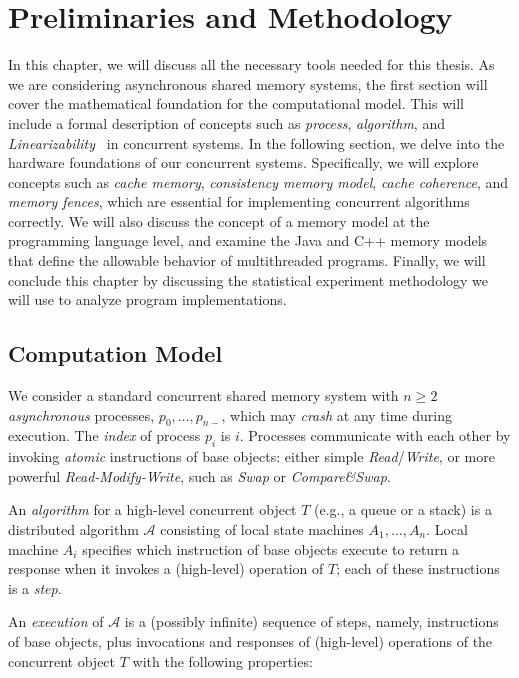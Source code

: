 \chapter{\label{chapter:preliminaries}Preliminaries and Methodology}

In this chapter, we will discuss all the necessary tools needed for this thesis. As we are considering asynchronous shared memory systems, the first section will cover the mathematical foundation for the computational model. This will include a formal description of concepts such as \emph{process},  \emph{algorithm}, and \emph{Linearizability~\cite{DBLP_journals_toplas_HerlihyW90}} in concurrent systems. In the following section, we delve into the hardware foundations of our concurrent systems. Specifically, we will explore concepts such as \emph{cache memory}, \emph{consistency memory model}, \emph{cache coherence}, and \emph{memory fences}, which are essential for implementing concurrent algorithms correctly. We will also discuss the concept of a memory model at the programming language level, and examine the Java and C++ memory models that define the allowable behavior of multithreaded programs. Finally, we will conclude this chapter by discussing the statistical experiment methodology we will use to analyze program implementations.

\section{\label{sec:computation-model}Computation Model}

We consider a standard concurrent shared memory system with \(n \ge 2\) \textit{asynchronous} processes, \(p_0, \ldots, p_{n-}\), which may \textit{crash} at any time during execution. The \textit{index} of process \(p_i\) is \(i\). Processes communicate with each other by invoking \textit{atomic} instructions of base objects: either simple \emph{Read}/\emph{Write}, or more powerful \emph{Read-Modify-Write}, such as \emph{Swap} or \emph{Compare\&Swap}.

An \emph{algorithm} for a high-level concurrent object \(T\) (e.g., a queue or a stack) is a distributed algorithm \(\mathcal{A}\) consisting of local state machines \(A_1,\ldots, A_n\). Local machine \(A_i\) specifies which instruction of base objects execute to return a response when it invokes a (high-level) operation of \(T\); each of these instructions is a \emph{step}.

An \emph{execution} of \(\mathcal{A}\) is a (possibly infinite) sequence of steps, namely, instructions of base objects, plus invocations and responses of (high-level) operations of the concurrent object \(T\) with the following properties:

